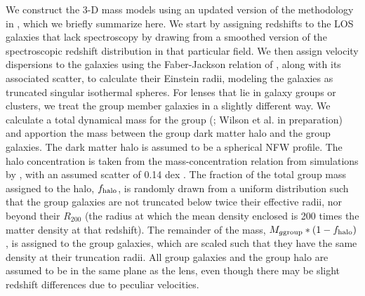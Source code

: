 We construct the 3-D mass models using an updated version of the methodology in \citet{Wong11}, which we briefly summarize here.  We start by assigning redshifts to the LOS galaxies that lack spectroscopy by drawing from a smoothed version of the spectroscopic redshift distribution in that particular field.  We then assign velocity dispersions to the galaxies using the Faber-Jackson relation of \citet{Bernardi03}, along with its associated scatter, to calculate their Einstein radii, modeling the galaxies as truncated singular isothermal spheres.  For lenses that lie in galaxy groups or clusters, we treat the group member galaxies in a slightly different way.  We calculate a total dynamical mass for the group (\citealt{Momcheva06}; Wilson et al. in preparation) and apportion the mass between the group dark matter halo and the group galaxies.  The dark matter halo is assumed to be a spherical NFW profile.  The halo concentration is taken from the mass-concentration relation from simulations by \citet{Zhao09}, with an assumed scatter of 0.14 dex \citep{Bullock01}.  The fraction of the total group mass assigned to the halo, $f_{\rm{halo}}$, is randomly drawn from a uniform distribution such that the group galaxies are not truncated below twice their effective radii, nor beyond their $R_200$ (the radius at which the mean density enclosed is 200 times the matter density at that redshift).  The remainder of the mass, $M_{g\rm{group}}*(1-f_{\rm{halo}})$, is assigned to the group galaxies, which are scaled such that they have the same density at their truncation radii.  All group galaxies and the group halo are assumed to be in the same plane as the lens, even though there may be slight redshift differences due to peculiar velocities.